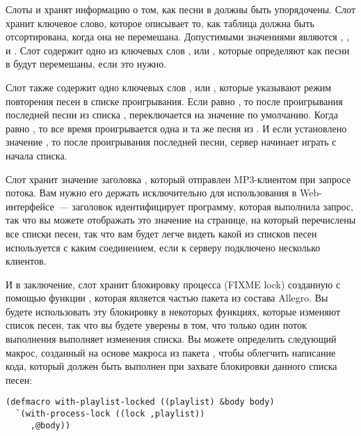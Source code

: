 Слоты  и  хранят информацию о том, как песни в
 должны быть упорядочены.  Слот  хранит ключевое слово,
которое описывает то, как таблица  должна быть отсортирована, когда она
не перемешана. Допустимыми значениями являются , ,
 и .  Слот  содержит одно из ключевых слов
,  или , которые определяют как песни в
 будут перемешаны, если это нужно.

Слот  также содержит одно ключевых слов ,  или
, которые указывают режим повторения песен в списке проигрывания.  Если
 равно , то после проигрывания последней песни из списка
,  переключается на значение по умолчанию. Когда
 равно , то все время проигрывается одна и та же песня из
.  И если установлено значение , то после проигрывания
последней песни, сервер начинает играть с начала списка.

Слот  хранит значение заголовка , который отправлен
MP3-клиентом при запросе потока.  Вам нужно его держать исключительно для использования в
Web-интерфейсе~--- заголовок  идентифицирует программу, которая выполнила
запрос, так что вы можете отображать это значение на странице, на который перечислены все
списки песен, так что вам будет легче видеть какой из списков песен используется с каким
соединением, если к серверу подключено несколько клиентов.

И в заключение, слот  хранит блокировку процесса (FIXME lock) созданную с
помощью функции , которая является частью пакета
 из состава Allegro.  Вы будете использовать эту блокировку в
некоторых функциях, которые изменяют список песен, так что вы будете уверены в том, что
только один поток выполнения выполняет изменения списка.  Вы можете определить следующий
макрос, созданный на основе макроса  из пакета
, чтобы облегчить написание кода, который должен быть выполнен при
захвате блокировки данного списка песен:

\begin{lstlisting}
(defmacro with-playlist-locked ((playlist) &body body)
  `(with-process-lock ((lock ,playlist))
     ,@body))
\end{lstlisting}

